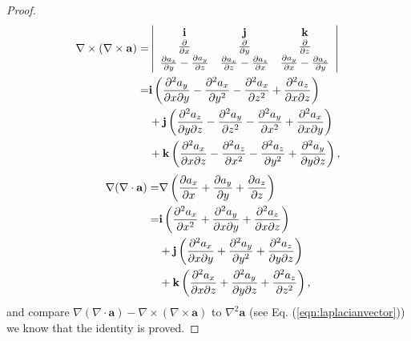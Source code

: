 \documentclass[11pt]{article}              %
\begin{document}
\begin{proof}
\begin{align}
    \nabla \times (\nabla \times {\mathbf a})=&\left|\begin{array}{ccc}{\mathbf i}&{\mathbf j}&{\mathbf k}\\\frac{\partial}{\partial x}&\frac{\partial}{\partial y}&\frac{\partial}{\partial z}\\\frac{\partial a_z}{\partial y}-\frac{\partial a_y}{\partial z}&\frac{\partial a_x}{\partial z}-\frac{\partial a_z}{\partial x}&\frac{\partial a_y}{\partial x}-\frac{\partial a_x}{\partial y}\end{array}\right|\notag\\
    =&{\mathbf i}\left(\frac{\partial^2a_y}{\partial x\partial y}-\frac{\partial^2a_x}{\partial y^2}-\frac{\partial^2a_x}{\partial z^2}+\frac{\partial^2a_z}{\partial x\partial z}\right)\notag\\
    &+{\mathbf j}\left(\frac{\partial^2a_z}{\partial y\partial z}-\frac{\partial^2a_y}{\partial z^2}-\frac{\partial^2a_y}{\partial x^2}+\frac{\partial^2a_x}{\partial x\partial y}\right)\notag\\
    &+{\mathbf k}\left(\frac{\partial^2a_x}{\partial x\partial z}-\frac{\partial^2a_z}{\partial x^2}-\frac{\partial^2a_z}{\partial y^2}+\frac{\partial^2a_y}{\partial y\partial z}\right),\notag
\end{align}
\begin{align}
    \nabla(\nabla\cdot {\mathbf a})=&\nabla\left(\frac{\partial a_x}{\partial x}+\frac{\partial a_y}{\partial y}+\frac{\partial a_z}{\partial z}\right)\notag\\
    =&{\mathbf i}\left(\frac{\partial^2 a_x}{\partial x^2}+\frac{\partial^2 a_y}{\partial x\partial y}+\frac{\partial^2 a_z}{\partial x\partial z}\right)\notag\\
    &+{\mathbf j}\left(\frac{\partial^2 a_x}{\partial x\partial y}+\frac{\partial^2 a_y}{\partial y^2}+\frac{\partial^2 a_z}{\partial y\partial z}\right)\notag\\
    &+{\mathbf k}\left(\frac{\partial^2 a_x}{\partial x\partial z}+\frac{\partial^2 a_y}{\partial y\partial z}+\frac{\partial^2 a_z}{\partial z^2}\right),\notag
\end{align}
and compare $\nabla(\nabla\cdot {\mathbf a})-\nabla \times (\nabla \times {\mathbf a})$ to $\nabla^2\mathbf{a}$ (see Eq. (\ref{eqn:laplacianvector})) we know that the identity is proved.
\end{proof}

\end{document}
